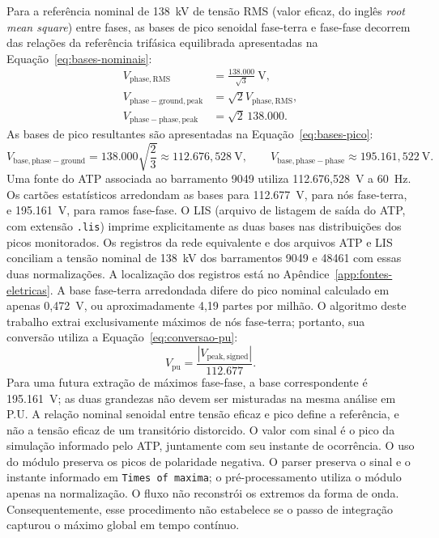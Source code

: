 \documentclass[
	12pt,				%
	openright,			%
	oneside,			%
	a4paper,			%
	chapter=TITLE,		%
	section=TITLE,		%
	subsection=TITLE,	%
	subsubsection=TITLE,%
	english,			%
	brazilian			%
	]{abntex2}
\theoremstyle{definition}
\begin{document}
Para a referência nominal de 138~kV de tensão RMS (valor eficaz, do inglês
\textit{root mean square}) entre fases, as bases
de pico senoidal fase-terra e fase-fase decorrem das relações da referência
trifásica equilibrada apresentadas na Equação~\ref{eq:bases-nominais}:
\begin{equation}
\label{eq:bases-nominais}
\begin{aligned}
V_{\mathrm{phase,RMS}} &= \frac{138.000}{\sqrt{3}}\ \mathrm{V}, \\
V_{\mathrm{phase-ground,peak}} &= \sqrt{2}V_{\mathrm{phase,RMS}}, \\
V_{\mathrm{phase-phase,peak}} &= \sqrt{2}\,138.000.
\end{aligned}
\end{equation}
As bases de pico resultantes são apresentadas na
Equação~\ref{eq:bases-pico}:
\begin{equation}
\label{eq:bases-pico}
V_{\mathrm{base,phase-ground}} = 138.000\sqrt{\frac{2}{3}}
\approx 112.676{,}528\ \mathrm{V},
\qquad
V_{\mathrm{base,phase-phase}} \approx 195.161{,}522\ \mathrm{V}.
\end{equation}
Uma fonte do ATP associada ao barramento 9049 utiliza 112.676,528~V a 60~Hz.
Os cartões estatísticos arredondam as bases para 112.677~V, para nós
fase-terra, e 195.161~V, para ramos fase-fase. O LIS (arquivo de listagem de saída do ATP, com extensão \texttt{.lis})
imprime explicitamente as
duas bases nas distribuições dos picos monitorados.
Os registros da rede equivalente e dos arquivos ATP e LIS conciliam a
tensão nominal de 138~kV dos barramentos 9049 e 48461 com essas duas
normalizações. A localização dos registros está no
Apêndice~\ref{app:fontes-eletricas}. A base fase-terra arredondada difere do pico
nominal calculado em apenas 0,472~V, ou aproximadamente 4,19 partes por
milhão. O algoritmo deste trabalho extrai exclusivamente máximos de nós
fase-terra; portanto, sua conversão utiliza a
Equação~\ref{eq:conversao-pu}:
\begin{equation}
\label{eq:conversao-pu}
V_{\mathrm{pu}} = \frac{|V_{\mathrm{peak,signed}}|}{112.677}.
\end{equation}
Para uma futura extração de máximos fase-fase, a base correspondente é
195.161~V; as duas grandezas não devem ser misturadas na mesma análise em P.U.
 A relação nominal senoidal entre tensão eficaz e pico define a referência, e
não a tensão eficaz de um transitório distorcido. O valor com sinal é o pico da
simulação informado pelo ATP, juntamente com seu instante de ocorrência. O uso
do módulo preserva os picos de polaridade negativa. O parser preserva o sinal e
o instante informado em \texttt{Times of maxima}; o pré-processamento utiliza o
módulo apenas na normalização. O fluxo não reconstrói os extremos da forma de
onda. Consequentemente, esse procedimento não estabelece se o passo de
integração capturou o máximo global em tempo contínuo.
\end{document}
